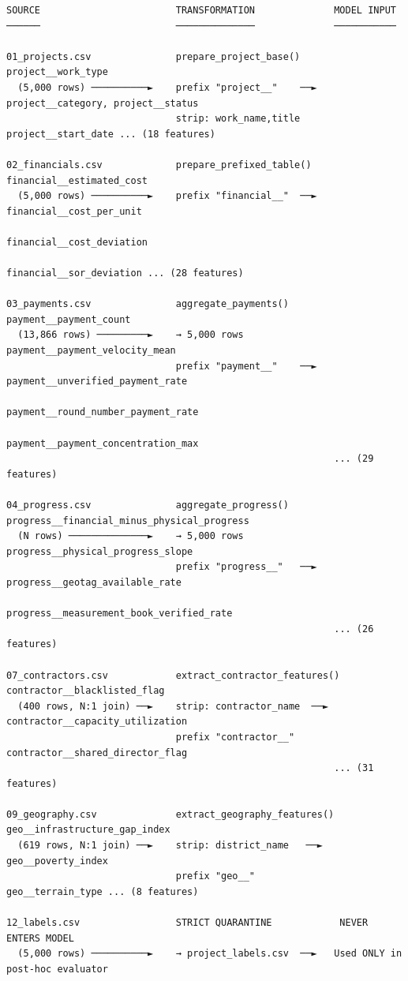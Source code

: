 \documentclass[11pt,a4paper]{article}
\begin{document}
\begin{tcolorbox}[colback=gray!5!white,colframe=gray!60!black,arc=1mm,boxrule=0.6pt,left=6pt,right=6pt,top=6pt,bottom=6pt]
\begin{lstlisting}[basicstyle=\ttfamily\scriptsize,breaklines=true,columns=flexible]
SOURCE                        TRANSFORMATION              MODEL INPUT
──────                        ──────────────              ───────────

01_projects.csv               prepare_project_base()      project__work_type
  (5,000 rows) ──────────►    prefix "project__"    ──►   project__category, project__status
                              strip: work_name,title       project__start_date ... (18 features)

02_financials.csv             prepare_prefixed_table()    financial__estimated_cost
  (5,000 rows) ──────────►    prefix "financial__"  ──►   financial__cost_per_unit
                                                          financial__cost_deviation
                                                          financial__sor_deviation ... (28 features)

03_payments.csv               aggregate_payments()        payment__payment_count
  (13,866 rows) ─────────►    → 5,000 rows                payment__payment_velocity_mean
                              prefix "payment__"    ──►   payment__unverified_payment_rate
                                                          payment__round_number_payment_rate
                                                          payment__payment_concentration_max
                                                          ... (29 features)

04_progress.csv               aggregate_progress()        progress__financial_minus_physical_progress
  (N rows) ──────────────►    → 5,000 rows                progress__physical_progress_slope
                              prefix "progress__"   ──►   progress__geotag_available_rate
                                                          progress__measurement_book_verified_rate
                                                          ... (26 features)

07_contractors.csv            extract_contractor_features() contractor__blacklisted_flag
  (400 rows, N:1 join) ──►    strip: contractor_name  ──►  contractor__capacity_utilization
                              prefix "contractor__"        contractor__shared_director_flag
                                                          ... (31 features)

09_geography.csv              extract_geography_features() geo__infrastructure_gap_index
  (619 rows, N:1 join) ──►    strip: district_name   ──►   geo__poverty_index
                              prefix "geo__"               geo__terrain_type ... (8 features)

12_labels.csv                 STRICT QUARANTINE            NEVER ENTERS MODEL
  (5,000 rows) ──────────►    → project_labels.csv  ──►   Used ONLY in post-hoc evaluator
\end{lstlisting}
\end{tcolorbox}
\end{document}
